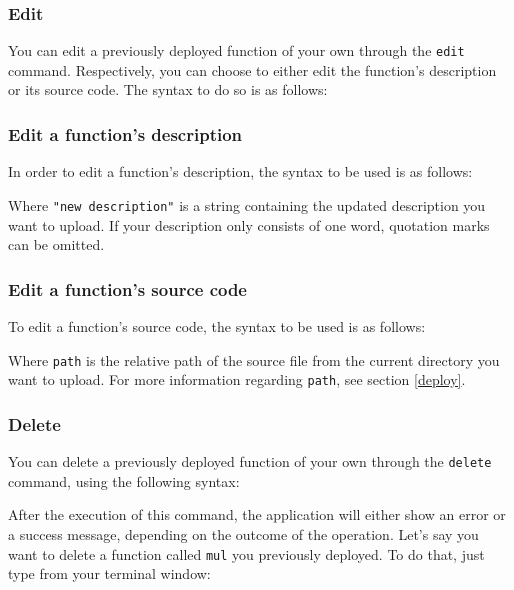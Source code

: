 \subsubsection{Edit}
You can edit a previously deployed function of your own through the \texttt{edit} command. Respectively, you can choose to either edit the function's description or its source code. The syntax to do so is as follows:
\begin{center}
\end{center}
\subsubsection{Edit a function's description}
In order to edit a function's description, the syntax to be used is as follows:
\begin{center}
\end{center}
Where \texttt{"new description"} is a string containing the updated description you want to upload. If your description only consists of one word, quotation marks can be omitted.

\subsubsection{Edit a function's source code}
To edit a function's source code, the syntax to be used is as follows:
\begin{center}
\end{center}
Where \texttt{path} is the relative path of the source file from the current directory you want to upload. For more information regarding \texttt{path}, see section \ref{deploy}.

\subsubsection{Delete}
You can delete a previously deployed function of your own through the \texttt{delete} command, using the following syntax:
\begin{center}
\end{center}
After the execution of this command, the application will either show an error or a success message, depending on the outcome of the operation.
Let's say you want to delete a function called \texttt{mul} you previously deployed. To do that, just type from your terminal window:
\begin{center}
\end{center}